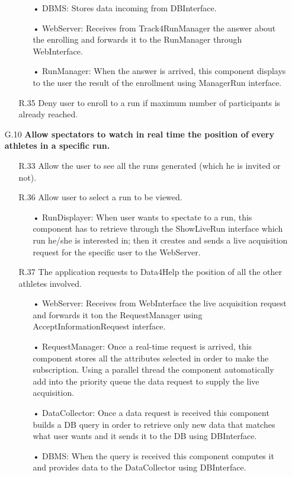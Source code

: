\begin{enumerate}
\begin{enumerate}
\begin{enumerate}
		\item[•] DBMS: Stores data incoming from DBInterface.
		\item[•] WebServer: Receives from Track4RunManager the answer about the enrolling and forwards it to the RunManager through WebInterface.
		\item[•] RunManager: When the answer is arrived, this component displays to the user the result of the enrollment using ManagerRun interface.
		\end{enumerate}	
			\item [R.35] Deny user to enroll to a run if maximum number of participants is already reached.
	\end{enumerate}
	
\item [G.10] \textbf{Allow spectators to watch in real time the position of every athletes in a specific run.}
	\begin{enumerate}
	\item [R.33] Allow the user to see all the runs generated (which he is invited or not).
	\item [R.36] Allow user to select a run to be viewed.
		\begin{enumerate}
		\item[•] RunDisplayer: When user wants to spectate to a run, this component has to retrieve through the ShowLiveRun interface which run he/she is interested in; then it creates and sends a live acquisition request for the specific user to the WebServer.
		\end{enumerate}	
	\item [R.37] The application requests to Data4Help the position of all the other athletes involved.
		\begin{enumerate}
		\item[•] WebServer: Receives from WebInterface the live acquisition request and forwards it ton the RequestManager using AcceptInformationRequest interface.
		\item[•] RequestManager: Once a real-time request is arrived, this component stores all the attributes selected in order to make the subscription. Using a parallel thread the component automatically add into the priority queue the data request to supply the live acquisition.
		\item[•] DataCollector: Once a data request is received this component builds a DB query in order to retrieve only new data that matches what user wants and it sends it to the DB using DBInterface.
		\item[•] DBMS: When the query is received this component computes it and provides data to the DataCollector using DBInterface.

\end{enumerate}
\end{enumerate}
\end{enumerate}
